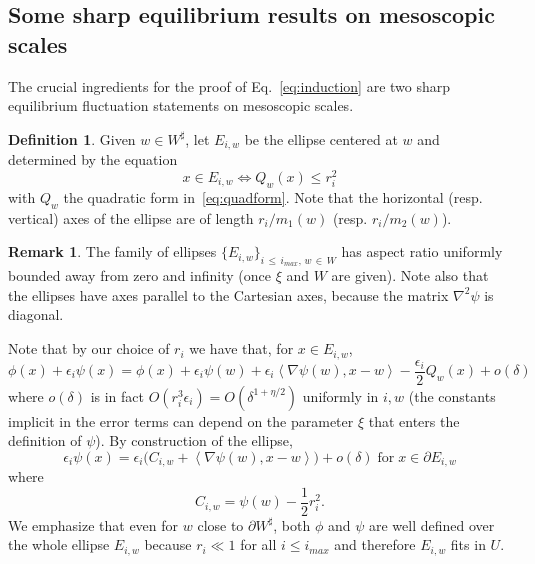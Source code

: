 \documentclass[10pt]{amsart}
\theoremstyle{definition}\newtheorem{defi}[theo]{Definition}\newtheorem{rema}[theo]{Remark}\newtheorem{exam}[theo]{Example}\newtheorem{exem}[theo]{Example}\newtheorem{nota}[theo]{Notation}
\renewcommand{\d}{{\sharp }}
\begin{document}
\subsection{Some sharp equilibrium results on mesoscopic scales}\label{sec:statement_equilibrium}

The crucial ingredients for the proof of Eq.~\eqref{eq:induction} are two sharp equilibrium fluctuation statements on mesoscopic scales.
\begin{defi}\label{def:Eiw}
Given $w \in W^\d$, let $E_{i,w}$ be the ellipse centered at $w$ and determined by the equation
\begin{equation}\label{eq:qformconst}
x\in E_{i,w}\Leftrightarrow Q_w(x)\le r_i^2
\end{equation}
with $Q_w$ the quadratic form in~\eqref{eq:quadform}. Note that the horizontal (resp. vertical) axes of the ellipse are of length $r_i/m_1(w)$ (resp. $r_i/m_2(w)$).
\end{defi}

\begin{rema}\label{rem:ellissi}
The family of ellipses $\{E_{i,w}\}_{i\,\le\,i_{max},\,w\,\in\,W}$ has aspect ratio uniformly bounded away from zero and infinity (once $\xi$ and $W$ are given). Note also that the ellipses have axes parallel to the Cartesian axes, because the matrix $\nabla^2\psi$ is diagonal.
\end{rema}

Note that by our choice of $r_i$ we have that, for $x\in E_{i,w}$,
\begin{equation}\label{eq:skoda}
\phi(x)+ \epsilon_{i}\psi(x) =\phi(x)+\epsilon_i\psi(w)+\epsilon_i \left\langle \nabla\psi(w), x-w\right\rangle-\frac{\epsilon_i}2 Q_w(x)+o(\delta)
\end{equation}
where $o(\delta)$ is in fact $O(r_i^3\epsilon_i)=O(
\delta^{1+\eta/2})$ uniformly in $i,w$ (the constants implicit in the error terms can depend on the parameter $\xi$ that enters the definition of $\psi$). By construction of the ellipse,
\begin{equation}\label{bcku}
\epsilon_{i}\psi(x)=\epsilon_i\Big(C_{i,w}+ \left\langle \nabla\psi(w), x-w\right\rangle\Big) +o(\delta) \;\text{for}\; x\in \partial E_{i,w}
\end{equation}
where
\begin{equation}\label{eq:C'}
C_{i,w}=\psi(w)-\frac12 r_i^2.
\end{equation}
We emphasize that even for $w$ close to $\partial W^\d$, both $\phi$ and $\psi$ are well defined over the whole ellipse $E_{i,w}$ because $r_i\ll1$ for all $i\le i_{max}$ and therefore $E_{i,w}$ fits in $U$.
\end{document}
